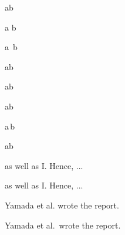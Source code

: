 \documentclass{ctexart}
\begin{document}
ab

a b

a\ b

a\quad b

a\qquad b

a\;b

a\,b

a\!b

as well as I. Hence, ...

as well as I\@. Hence, ...

Yamada et al. wrote the report.

Yamada et al.\ wrote the report.
\end{document}
